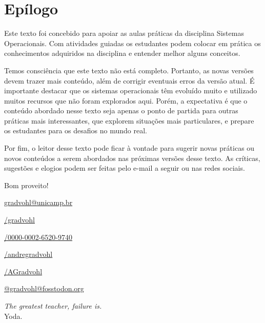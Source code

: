 \chapter*{Epílogo}\label{chp:epilogo}

Este texto foi concebido para apoiar as aulas práticas da disciplina Sistemas Operacionais. Com atividades guiadas os estudantes podem colocar em prática os conhecimentos adquiridos na disciplina e entender melhor alguns conceitos.

Temos consciência que este texto não está completo. Portanto, as novas versões devem trazer mais conteúdo, além de corrigir eventuais erros da versão atual.  É importante destacar que os sistemas operacionais têm evoluído muito e utilizado muitos recursos que não foram explorados aqui. Porém, a expectativa é que o conteúdo abordado nesse texto seja apenas o ponto de partida para outras práticas mais interessantes, que explorem situações mais particulares, e prepare os estudantes para os desafios no mundo real. 

Por fim, o leitor desse texto pode ficar à vontade para sugerir novas práticas ou novos conteúdos a serem abordados nas próximas versões desse texto. As críticas, sugestões e elogios podem ser feitas pelo e-mail a seguir ou nas redes sociais.

Bom proveito!

\href{mailto://gradvohl@unicamp.br}{\xspace gradvohl@unicamp.br}

\href{https://github.com/gradvohl}{/gradvohl}

\href{https://orcid.org/0000-0002-6520-9740}{\textcolor{orcidlogocol}{}/0000-0002-6520-9740}

\href{https://www.linkedin.com/in/andregradvohl}{\textcolor{linkedinlogocol}{}/andregradvohl}

\href{https://twitter.com/AGradvohl}{\textcolor{twitterlogocol}{}/AGradvohl}

\href{https://fosstodon.org/@gradvohl}{\textcolor{mastodonlogocol}{} @gradvohl@fosstodon.org}

\vspace*{\fill}
\begin{flushright}
    \textit{The greatest teacher, failure is.}\\
    Yoda.
\end{flushright}

